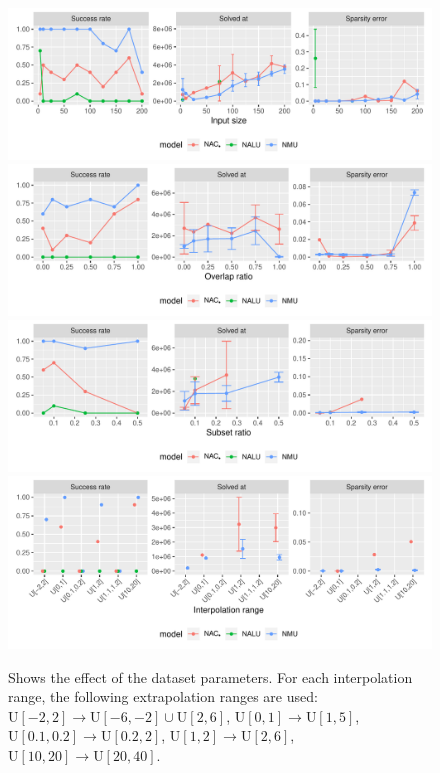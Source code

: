\begin{figure}[h]
\centering
\includegraphics[width=\linewidth,trim={0 1.3cm 0 0},clip]{results/simple_function_static_input_size.pdf}
\includegraphics[width=\linewidth,trim={0 1.3cm 0 0.809cm},clip]{results/simple_function_static_overlap.pdf}
\includegraphics[width=\linewidth,trim={0 1.3cm 0 0.809cm},clip]{results/simple_function_static_subset.pdf}
\includegraphics[width=\linewidth,trim={0 0 0 0.809cm},clip]{results/simple_function_static_range.pdf}
\caption{Shows the effect of the dataset parameters. For each interpolation range, the following extrapolation ranges are used: ${\mathrm{U}[-2,2] \rightarrow \mathrm{U}[-6,-2] \cup \mathrm{U}[2,6]}$, ${\mathrm{U}[0,1] \rightarrow \mathrm{U}[1,5]}$, ${\mathrm{U}[0.1,0.2] \rightarrow \mathrm{U}[0.2,2]}$, ${\mathrm{U}[1,2] \rightarrow \mathrm{U}[2,6]}$, ${\mathrm{U}[10, 20] \rightarrow \mathrm{U}[20, 40]}$.}
\label{fig:simple-function-static-boundary}
\end{figure}
